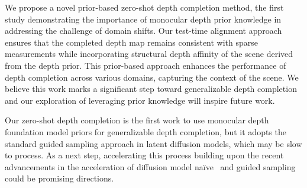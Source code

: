 We propose a novel prior-based zero-shot depth completion method, the first study demonstrating the importance of monocular depth prior knowledge in addressing the challenge of domain shifts.
Our test-time alignment approach ensures that the completed depth map remains consistent with sparse measurements while incorporating structural depth affinity of the scene derived from the depth prior.
This prior-based approach enhances the performance of depth completion across various domains, capturing the context of the scene.
We believe this work marks a significant step toward generalizable depth completion and our exploration of leveraging prior knowledge will inspire future work.


Our zero-shot depth completion is the first work to use monocular depth foundation model priors for generalizable depth completion, but it adopts the standard guided sampling approach in latent diffusion models, which may be slow to process.
As a next step, accelerating this process building upon the recent advancements in the acceleration of diffusion model naïve~\cite{song2023consistency} and guided sampling~\cite{chung2022come} could be promising directions.

